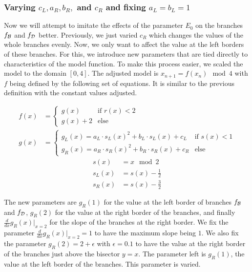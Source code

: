 \subsubsection{Varying $c_L, a_R, b_R,$ and $c_R$ and fixing $a_L = b_L = 1$}

Now we will attempt to imitate the effects of the parameter $E_0$ on the branches $f_{\mathcal{B}}$ and $f_{\mathcal{D}}$ better.
Previously, we just varied $c_R$ which changes the values of the whole branches evenly.
Now, we only want to affect the value at the left borders of these branches.
For this, we introduce new parameters that are tied directly to characteristics of the model function.
To make this process easier, we scaled the model to the domain $[0, 4]$.
The adjusted model is $x_{n+1} = f(x_n) \mod 4$ with $f$ being defined by the following set of equations.
It is similar to the previous definition with the constant values adjusted.

\begin{align}
	f(x) & = \begin{cases}
		         g(x)     & \text{if } r(x) < 2 \\
		         g(x) + 2 & \text{else}
	         \end{cases}                                             \\
	g(x) & = \begin{cases}
		         g_L(x) = a_L \cdot s_L(x)^2 + b_L \cdot s_L(x) + c_L & \text{if } s(x) < 1 \\
		         g_R(x) = a_R \cdot s_R(x)^2 + b_R \cdot s_R(x) + c_R & \text{else}
	         \end{cases}
\end{align}
\begin{subequations}
	\begin{align}
		s(x)   & = x \mod 2           \\
		s_L(x) & = s(x) - \frac{1}{2} \\
		s_R(x) & = s(x) - \frac{3}{2}
	\end{align}
\end{subequations}

The new parameters are $g_R(1)$ for the value at the left border of branches $f_{\mathcal{B}}$ and $f_{\mathcal{D}}$, $g_R(2)$ for the value at the right border of the branches, and finally $\frac{d}{dx} g_R(x) |_{x = 2}$ for the slope of the branches at the right border.
We fix the parameter $\frac{d}{dx} g_R(x) |_{x = 2} = 1$ to have the maximum slope being $1$.
We also fix the parameter $g_R(2) = 2 + \epsilon$ with $\epsilon = 0.1$ to have the value at the right border of the branches just above the bisector $y = x$.
The parameter left is $g_R(1)$, the value at the left border of the branches.
This parameter is varied.

